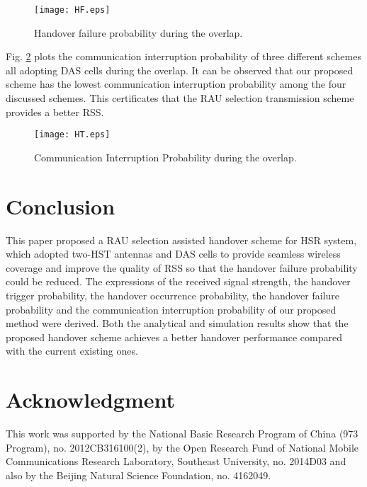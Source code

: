 \documentclass[a4paper,twocolumn,10pt]{IEEEtran}
\newcommand{\picspacec}{{\vspace{-0.1 in}}}
\begin{document}
\begin{figure}
\centering
\texttt{[image: HF.eps]}
\caption{Handover failure probability during the overlap.}
\label{HF}\picspacec
\end{figure}



Fig. \ref{HT} plots the communication interruption probability of three different schemes all adopting DAS cells during the overlap. It can be observed that our proposed scheme has the lowest communication interruption probability among the four discussed schemes.  This certificates that the RAU selection transmission scheme provides a better RSS.


\begin{figure}
\centering
\texttt{[image: HT.eps]}
\caption{Communication Interruption Probability during the overlap.}
\label{HT}\picspacec
\end{figure}

\section{Conclusion}
This paper proposed a RAU selection assisted handover scheme for HSR system, which adopted two-HST antennas and DAS cells to provide seamless wireless coverage and improve the quality of RSS so that the handover failure probability could be reduced. The expressions of the received signal strength, the handover trigger probability, the handover occurrence probability, the handover failure probability and the communication interruption probability of our proposed method were derived. Both the analytical and simulation results show that the proposed handover scheme achieves a better handover performance compared with the current existing ones.

\section*{Acknowledgment}
This work was supported by the National
Basic Research Program of China (973 Program), no. 2012CB316100(2), by the Open Research
Fund of National Mobile Communications Research Laboratory, Southeast University, no. 2014D03 and also by the Beijing Natural Science Foundation, no. 4162049.
\end{document}
